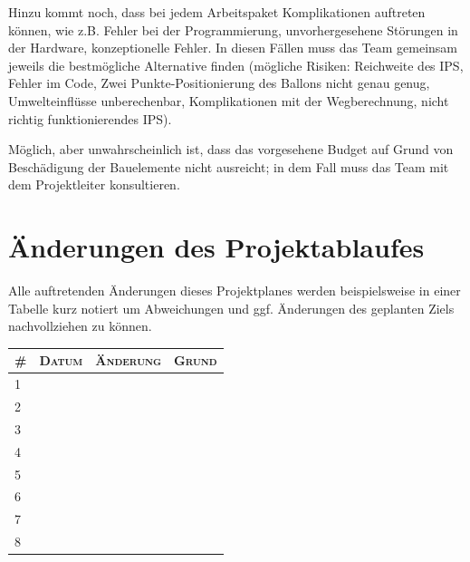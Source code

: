 \documentclass[lang=ngerman,inputenc=utf8,fontsize=10pt]{ldvarticle}
\begin{document}
Hinzu kommt noch, dass bei jedem Arbeitspaket Komplikationen auftreten können, wie z.B. Fehler bei der Programmierung, unvorhergesehene Störungen in der Hardware, konzeptionelle Fehler. In diesen Fällen muss das Team gemeinsam jeweils die bestmögliche Alternative finden (mögliche Risiken: Reichweite des IPS, Fehler im Code, Zwei Punkte-Positionierung des Ballons nicht genau genug, Umwelteinflüsse unberechenbar, Komplikationen mit der Wegberechnung, nicht richtig funktionierendes IPS).


Möglich, aber unwahrscheinlich ist, dass das vorgesehene Budget auf Grund von Beschädigung der Bauelemente nicht ausreicht; in dem Fall muss das Team mit dem Projektleiter konsultieren.


\section{Änderungen des Projektablaufes}
Alle auftretenden Änderungen dieses Projektplanes werden beispielsweise in einer Tabelle kurz notiert um Abweichungen und ggf. Änderungen des geplanten Ziels nachvollziehen zu können.



\begin{tabular}[htbp]{|p{}||p{}|p{}|p{}|}
	\hline
	\textsc{\#} & \textsc{Datum} & \textsc{Änderung} & \textsc{Grund} \\
	\hline
	\hline
	1 & & & \\[1em]
	\hline
	2 & & & \\[1em]
	\hline
	3 & & & \\[1em]
	\hline
	4 & & & \\[1em]
	\hline
	5 & & & \\[1em]
	\hline
	6 & & & \\[1em]
	\hline
	7 & & & \\[1em]
	\hline
	8 & & & \\[1em]
	\hline
\end{tabular}
\end{document}
